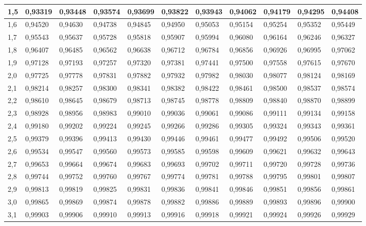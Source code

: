 \documentclass[12pt,a4paper]{article}
\begin{document}
\begin{tabular}{l|l|l|l|l|l|l|l|l|l|l}
1,5 & 0,93319 & 0,93448 & 0,93574 & 0,93699 & 0,93822 & 0,93943 & 0,94062 & 0,94179 & 0,94295 & 0,94408\\ \hline
1,6 & 0,94520 & 0,94630 & 0,94738 & 0,94845 & 0,94950 & 0,95053 & 0,95154 & 0,95254 & 0,95352 & 0,95449\\ \hline
1,7 & 0,95543 & 0,95637 & 0,95728 & 0,95818 & 0,95907 & 0,95994 & 0,96080 & 0,96164 & 0,96246 & 0,96327\\ \hline
1,8 & 0,96407 & 0,96485 & 0,96562 & 0,96638 & 0,96712 & 0,96784 & 0,96856 & 0,96926 & 0,96995 & 0,97062\\ \hline
1,9 & 0,97128 & 0,97193 & 0,97257 & 0,97320 & 0,97381 & 0,97441 & 0,97500 & 0,97558 & 0,97615 & 0,97670\\ \hline
2,0 & 0,97725 & 0,97778 & 0,97831 & 0,97882 & 0,97932 & 0,97982 & 0,98030 & 0,98077 & 0,98124 & 0,98169\\ \hline
2,1 & 0,98214 & 0,98257 & 0,98300 & 0,98341 & 0,98382 & 0,98422 & 0,98461 & 0,98500 & 0,98537 & 0,98574\\ \hline
2,2 & 0,98610 & 0,98645 & 0,98679 & 0,98713 & 0,98745 & 0,98778 & 0,98809 & 0,98840 & 0,98870 & 0,98899\\ \hline
2,3 & 0,98928 & 0,98956 & 0,98983 & 0,99010 & 0,99036 & 0,99061 & 0,99086 & 0,99111 & 0,99134 & 0,99158\\ \hline
2,4 & 0,99180 & 0,99202 & 0,99224 & 0,99245 & 0,99266 & 0,99286 & 0,99305 & 0,99324 & 0,99343 & 0,99361\\ \hline
2,5 & 0,99379 & 0,99396 & 0,99413 & 0,99430 & 0,99446 & 0,99461 & 0,99477 & 0,99492 & 0,99506 & 0,99520\\ \hline
2,6 & 0,99534 & 0,99547 & 0,99560 & 0,99573 & 0,99585 & 0,99598 & 0,99609 & 0,99621 & 0,99632 & 0,99643\\ \hline
2,7 & 0,99653 & 0,99664 & 0,99674 & 0,99683 & 0,99693 & 0,99702 & 0,99711 & 0,99720 & 0,99728 & 0,99736\\ \hline
2,8 & 0,99744 & 0,99752 & 0,99760 & 0,99767 & 0,99774 & 0,99781 & 0,99788 & 0,99795 & 0,99801 & 0,99807\\ \hline
2,9 & 0,99813 & 0,99819 & 0,99825 & 0,99831 & 0,99836 & 0,99841 & 0,99846 & 0,99851 & 0,99856 & 0,99861\\ \hline
3,0 & 0,99865 & 0,99869 & 0,99874 & 0,99878 & 0,99882 & 0,99886 & 0,99889 & 0,99893 & 0,99896 & 0,99900\\ \hline
3,1 & 0,99903 & 0,99906 & 0,99910 & 0,99913 & 0,99916 & 0,99918 & 0,99921 & 0,99924 & 0,99926 & 0,99929\\ \hline

\end{tabular}
\end{document}
